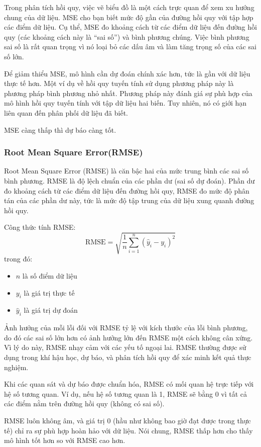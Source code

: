 \documentclass[conference]{IEEEtran}
\begin{document}
Trong phân tích hồi quy, việc vẽ biểu đồ là một cách trực quan để xem xu hướng chung của dữ liệu. MSE cho bạn biết mức độ gần của đường hồi quy với tập hợp các điểm dữ liệu. Cụ thể, MSE đo khoảng cách từ các điểm dữ liệu đến đường hồi quy (các khoảng cách này là “sai số”) và bình phương chúng. Việc bình phương sai số là rất quan trọng vì nó loại bỏ các dấu âm và làm tăng trọng số của các sai số lớn.

Để giảm thiểu MSE, mô hình cần dự đoán chính xác hơn, tức là gần với dữ liệu thực tế hơn. Một ví dụ về hồi quy tuyến tính sử dụng phương pháp này là phương pháp bình phương nhỏ nhất. Phương pháp này đánh giá sự phù hợp của mô hình hồi quy tuyến tính với tập dữ liệu hai biến. Tuy nhiên, nó có giới hạn liên quan đến phân phối dữ liệu đã biết.

MSE càng thấp thì dự báo càng tốt.


\subsubsection{Root Mean Square Error(RMSE)}


Root Mean Square Error (RMSE) là căn bậc hai của mức trung bình các sai số bình phương. RMSE là độ lệch chuẩn của các phần dư (sai số dự đoán). Phần dư đo khoảng cách từ các điểm dữ liệu đến đường hồi quy, RMSE đo mức độ phân tán của các phần dư này, tức là mức độ tập trung của dữ liệu xung quanh đường hồi quy.

Công thức tính RMSE:
\[
\text{RMSE} = \sqrt{\frac{1}{n} \sum_{i=1}^{n} (\hat{y}_i - y_i)^2}
\]
trong đó:
\begin{itemize}
    \item $n$ là số điểm dữ liệu
    \item $y_i$ là giá trị thực tế
    \item $\hat{y}_i$ là giá trị dự đoán
\end{itemize}

Ảnh hưởng của mỗi lỗi đối với RMSE tỷ lệ với kích thước của lỗi bình phương, do đó các sai số lớn hơn có ảnh hưởng lớn đến RMSE một cách không cân xứng. Vì lý do này, RMSE nhạy cảm với các yếu tố ngoại lai. RMSE thường được sử dụng trong khí hậu học, dự báo, và phân tích hồi quy để xác minh kết quả thực nghiệm.

Khi các quan sát và dự báo được chuẩn hóa, RMSE có mối quan hệ trực tiếp với hệ số tương quan. Ví dụ, nếu hệ số tương quan là 1, RMSE sẽ bằng 0 vì tất cả các điểm nằm trên đường hồi quy (không có sai số).

RMSE luôn không âm, và giá trị 0 (hầu như không bao giờ đạt được trong thực tế) chỉ ra sự phù hợp hoàn hảo với dữ liệu. Nói chung, RMSE thấp hơn cho thấy mô hình tốt hơn so với RMSE cao hơn.
\end{document}
